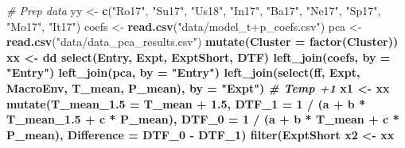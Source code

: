 \documentclass[
]{article}
\newenvironment{Shaded}{\begin{snugshade}}{\end{snugshade}}
\newcommand{\CommentTok}[1]{\textcolor[rgb]{0.56,0.35,0.01}{\textit{#1}}}
\newcommand{\DataTypeTok}[1]{\textcolor[rgb]{0.13,0.29,0.53}{#1}}
\newcommand{\DecValTok}[1]{\textcolor[rgb]{0.00,0.00,0.81}{#1}}
\newcommand{\FloatTok}[1]{\textcolor[rgb]{0.00,0.00,0.81}{#1}}
\newcommand{\KeywordTok}[1]{\textcolor[rgb]{0.13,0.29,0.53}{\textbf{#1}}}
\newcommand{\NormalTok}[1]{#1}
\newcommand{\OperatorTok}[1]{\textcolor[rgb]{0.81,0.36,0.00}{\textbf{#1}}}
\newcommand{\StringTok}[1]{\textcolor[rgb]{0.31,0.60,0.02}{#1}}
\begin{document}
\begin{Shaded}
\begin{Highlighting}[]
\CommentTok{# Prep data}
\NormalTok{yy <-}\StringTok{ }\KeywordTok{c}\NormalTok{(}\StringTok{"Ro17"}\NormalTok{, }\StringTok{"Su17"}\NormalTok{, }\StringTok{"Us18"}\NormalTok{, }\StringTok{"In17"}\NormalTok{, }\StringTok{"Ba17"}\NormalTok{, }\StringTok{"Ne17"}\NormalTok{, }\StringTok{"Sp17"}\NormalTok{, }\StringTok{"Mo17"}\NormalTok{, }\StringTok{"It17"}\NormalTok{)}
\NormalTok{coefs <-}\StringTok{ }\KeywordTok{read.csv}\NormalTok{(}\StringTok{"data/model_t+p_coefs.csv"}\NormalTok{)}
\NormalTok{pca <-}\StringTok{ }\KeywordTok{read.csv}\NormalTok{(}\StringTok{"data/data_pca_results.csv"}\NormalTok{) }\OperatorTok{%
\StringTok{  }\KeywordTok{mutate}\NormalTok{(}\DataTypeTok{Cluster =} \KeywordTok{factor}\NormalTok{(Cluster))}
\NormalTok{xx <-}\StringTok{ }\NormalTok{dd }\OperatorTok{%
\StringTok{  }\KeywordTok{select}\NormalTok{(Entry, Expt, ExptShort, DTF) }\OperatorTok{%
\StringTok{  }\KeywordTok{left_join}\NormalTok{(coefs, }\DataTypeTok{by =} \StringTok{"Entry"}\NormalTok{) }\OperatorTok{%
\StringTok{  }\KeywordTok{left_join}\NormalTok{(pca, }\DataTypeTok{by =} \StringTok{"Entry"}\NormalTok{) }\OperatorTok{%
\StringTok{  }\KeywordTok{left_join}\NormalTok{(}\KeywordTok{select}\NormalTok{(ff, Expt, MacroEnv, T_mean, P_mean), }\DataTypeTok{by =} \StringTok{"Expt"}\NormalTok{)}
\CommentTok{# Temp +1}
\NormalTok{x1 <-}\StringTok{ }\NormalTok{xx }\OperatorTok{%
\StringTok{  }\KeywordTok{mutate}\NormalTok{(}\DataTypeTok{T_mean_1.5 =}\NormalTok{ T_mean }\OperatorTok{+}\StringTok{ }\FloatTok{1.5}\NormalTok{,}
         \DataTypeTok{DTF_1 =} \DecValTok{1} \OperatorTok{/}\StringTok{ }\NormalTok{(a }\OperatorTok{+}\StringTok{ }\NormalTok{b }\OperatorTok{*}\StringTok{ }\NormalTok{T_mean_}\FloatTok{1.5} \OperatorTok{+}\StringTok{ }\NormalTok{c }\OperatorTok{*}\StringTok{ }\NormalTok{P_mean),}
         \DataTypeTok{DTF_0  =} \DecValTok{1} \OperatorTok{/}\StringTok{ }\NormalTok{(a }\OperatorTok{+}\StringTok{ }\NormalTok{b }\OperatorTok{*}\StringTok{ }\NormalTok{T_mean }\OperatorTok{+}\StringTok{ }\NormalTok{c }\OperatorTok{*}\StringTok{ }\NormalTok{P_mean),}
         \DataTypeTok{Difference =}\NormalTok{ DTF_}\DecValTok{0} \OperatorTok{-}\StringTok{ }\NormalTok{DTF_}\DecValTok{1}\NormalTok{) }\OperatorTok{%
\StringTok{  }\KeywordTok{filter}\NormalTok{(ExptShort }\OperatorTok{%
\NormalTok{x2 <-}\StringTok{ }\NormalTok{xx }\OperatorTok{%
}}}}}}}}}
\end{Highlighting}
\end{Shaded}
\end{document}
